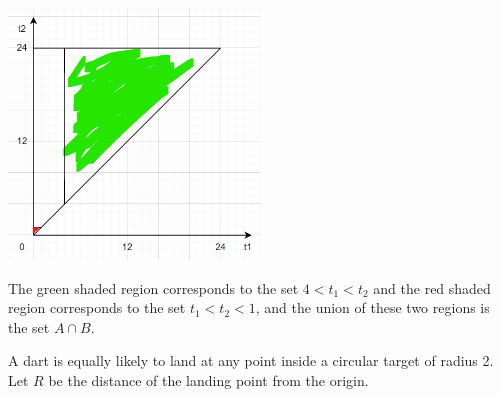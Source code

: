 \documentclass[answers]{exam}
\begin{document}
\begin{questions}
\begin{parts}
\begin{solution}
            \begin{center}
                \includegraphics[width=0.5\textwidth]{images/3d.png}
            \end{center}

            The green shaded region corresponds to the set $4 < t_1 < t_2$ and the red
            shaded region corresponds to the set $t_1 < t_2 < 1$, and the union of these
            two regions is the set $A \cap B$.
        \end{solution}
    \end{parts}

    \question
    A dart is equally likely to land at any point inside a circular target of radius 2. Let $R$ be the distance of the landing point from the origin.
\end{questions}
\end{document}
